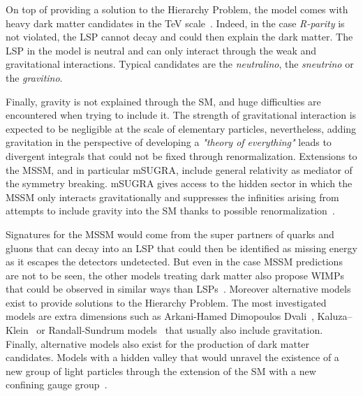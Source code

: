 \endgroup
	
	On top of providing a solution to the Hierarchy Problem, the model comes with heavy dark matter candidates in the \si{TeV} scale~\cite{JUNGMAN1996}. Indeed, in the case \textit{R-parity} is not violated, the \acf{LSP} cannot decay and could then explain the dark matter. The LSP in the model is neutral and can only interact through the weak and gravitational interactions. Typical candidates are the \textit{neutralino}, the \textit{sneutrino} or the \textit{gravitino}.
	
	Finally, gravity is not explained through the SM, and huge difficulties are encountered when trying to include it. The strength of gravitational interaction is expected to be negligible at the scale of elementary particles, nevertheless, adding gravitation in the perspective of developing a \textit{"theory of everything"} leads to divergent integrals that could not be fixed through renormalization. Extensions to the MSSM, and in particular \acf{mSUGRA}, include general relativity as mediator of the symmetry breaking. mSUGRA gives access to the hidden sector in which the MSSM only interacts gravitationally and suppresses the infinities arising from attempts to include gravity into the SM thanks to possible renormalization~\cite{CHAMSEDDINE1982}.
	
	Signatures for the MSSM would come from the super partners of quarks and gluons that can decay into an LSP that could then be identified as missing energy as it escapes the detectors undetected. But even in the case MSSM predictions are not to be seen, the other models treating dark matter also propose \acf{WIMPs} that could be observed in similar ways than LSPs~\cite{ASKEW2014}. Moreover alternative models exist to provide solutions to the Hierarchy Problem. The most investigated models are extra dimensions such as Arkani-Hamed Dimopoulos Dvali~\cite{ADD1998,ADD1999}, Kaluza–Klein~\cite{KALUZA1921,KLEIN1926} or Randall-Sundrum models~\cite{RS1999I,RS1999II} that usually also include gravitation. Finally, alternative models also exist for the production of dark matter candidates. Models with a hidden valley that would unravel the existence of a new group of light particles through the extension of the SM with a new confining gauge group~\cite{ZUREK2007}.\\
	
